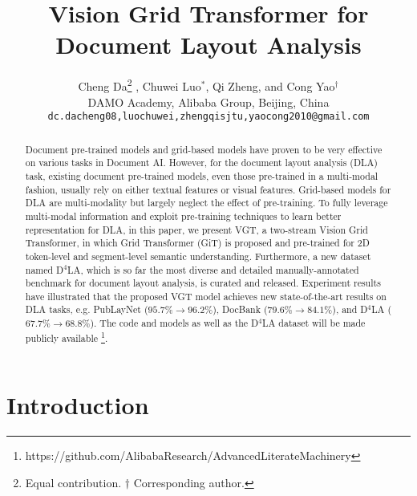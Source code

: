 \documentclass[10pt,twocolumn,letterpaper]{article}
\begin{document}
\title{Vision Grid Transformer for Document Layout Analysis}

\author{Cheng Da\thanks{Equal contribution. $\dagger$ Corresponding author.} , Chuwei Luo$^{*}$, Qi Zheng, and Cong Yao$^{\dagger}$  \\
DAMO Academy, Alibaba Group, Beijing, China\\
{\tt\small {dc.dacheng08,luochuwei,zhengqisjtu,yaocong2010}@gmail.com}
}

\maketitle
\ificcvfinal\thispagestyle{empty}\fi

\begin{abstract}
Document pre-trained models and grid-based models have proven to be very effective on various tasks in Document AI. However, for the document layout analysis (DLA) task, existing document pre-trained models, even those pre-trained in a multi-modal fashion, usually rely on either textual features or visual features. Grid-based models for DLA are multi-modality but largely neglect the effect of pre-training. To fully leverage multi-modal information and exploit pre-training techniques to learn better representation for DLA, in this paper, we present VGT, a two-stream Vision Grid Transformer, in which Grid Transformer (GiT) is proposed and pre-trained for 2D token-level and segment-level semantic understanding. Furthermore, a new dataset named D$^4$LA, which is so far the most diverse and detailed manually-annotated benchmark for document layout analysis, is curated and released. Experiment results have illustrated that the proposed VGT model achieves new state-of-the-art results on DLA tasks, e.g. PubLayNet ($95.7\%$$\rightarrow$$96.2\%$), DocBank ($79.6\%$$\rightarrow$$84.1\%$), and D$^4$LA ($67.7\%$$\rightarrow$$68.8\%$). The code and models as well as the D$^4$LA dataset will be made publicly available \footnote{https://github.com/AlibabaResearch/AdvancedLiterateMachinery}.
\end{abstract}

\section{Introduction}
\end{document}
